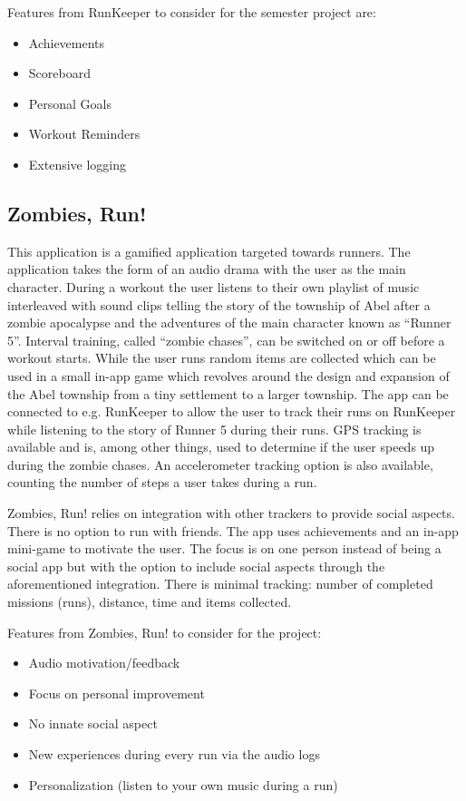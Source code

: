 Features from RunKeeper to consider for the semester project are:

\begin{itemize}
	\item{Achievements}
	\item{Scoreboard}
	\item{Personal Goals}
	\item{Workout Reminders}
	\item{Extensive logging}
\end{itemize}

\subsection{Zombies, Run!}
This application is a gamified application targeted towards runners. The application takes the form of an audio drama with the user as the main character. During a workout the user listens to their own playlist of music interleaved with sound clips telling the story of the township of Abel after a zombie apocalypse and the adventures of the main character known as ``Runner 5''. Interval training, called ``zombie chases'', can be switched on or off before a workout starts. While the user runs random items are collected which can be used in a small in-app game which revolves around the design and expansion of the Abel township from a tiny settlement to a larger township. The app can be connected to e.g. RunKeeper to allow the user to track their runs on RunKeeper while listening to the story of Runner 5 during their runs. \ac{GPS} tracking is available and is, among other things, used to determine if the user speeds up during the zombie chases. An accelerometer tracking option is also available, counting the number of steps a user takes during a run.

Zombies, Run! relies on integration with other trackers to provide social aspects. There is no option to run with friends. The app uses achievements and an in-app mini-game to motivate the user. The focus is on one person instead of being a social app but with the option to include social aspects through the aforementioned integration. There is minimal tracking: number of completed missions (runs), distance, time and items collected.

Features from Zombies, Run! to consider for the project:

\begin{itemize}
	\item{Audio motivation/feedback}
	\item{Focus on personal improvement}
	\item{No innate social aspect}
	\item{New experiences during every run via the audio logs}
	\item{Personalization (listen to your own music during a run)}
\end{itemize}
